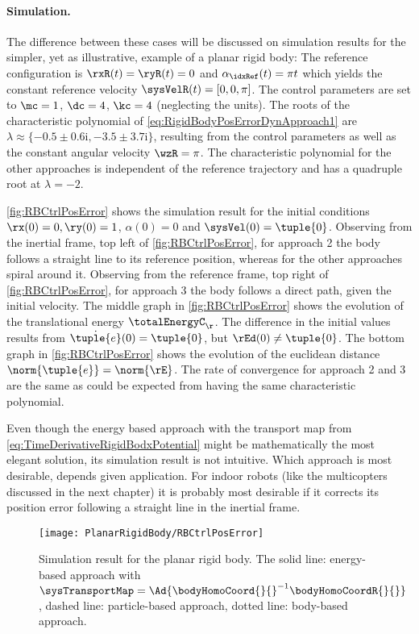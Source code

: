 \paragraph{Simulation.}
The difference between these cases will be discussed on simulation results for the simpler, yet as illustrative, example of a planar rigid body:
The reference configuration is $\rxR(t) = \ryR(t) = 0$ and $\alpha_{\idxRef}(t) = \pi t$ which yields the constant reference velocity $\sysVelR(t) = [0,0,\pi]$.
The control parameters are set to $\mc=1$, $\dc=4$, $\kc=4$ (neglecting the units).
The roots of the characteristic polynomial of \eqref{eq:RigidBodyPosErrorDynApproach1} are $\lambda \approx \{-0.5 \pm 0.6\mathrm{i}, -3.5 \pm 3.7\mathrm{i} \}$, resulting from the control parameters as well as the constant angular velocity $\wzR=\pi$.
The characteristic polynomial for the other approaches is independent of the reference trajectory and has a quadruple root at $\lambda = -2$.

\autoref{fig:RBCtrlPosError} shows the simulation result for the initial conditions $\rx(0) = 0, \ry(0) = 1$, $\alpha(0) = 0$ and $\sysVel(0) = \tuple{0}$.
Observing from the inertial frame, top left of \autoref{fig:RBCtrlPosError}, for approach 2 the body follows a straight line to its reference position, whereas for the other approaches spiral around it.
Observing from the reference frame, top right of \autoref{fig:RBCtrlPosError}, for approach 3 the body follows a direct path, given the initial velocity.
The middle graph in \autoref{fig:RBCtrlPosError} shows the evolution of the translational energy $\totalEnergyC_{\r}$.
The difference in the initial values results from $\dot{\tuple{e}}(0) = \tuple{0}$, but $\rEd(0) \neq \tuple{0}$.
The bottom graph in \autoref{fig:RBCtrlPosError} shows the evolution of the euclidean distance $\norm{\tuple{e}} = \norm{\rE}$.
The rate of convergence for approach 2 and 3 are the same as could be expected from having the same characteristic polynomial.

Even though the energy based approach with the transport map from \eqref{eq:TimeDerivativeRigidBodxPotential} might be mathematically the most elegant solution, its simulation result is not intuitive.
Which approach is most desirable, depends given application.
For indoor robots (like the multicopters discussed in the next chapter) it is probably most desirable if it corrects its position error following a straight line in the inertial frame.

\begin{figure}[ht]
 \centering
 \texttt{[image: PlanarRigidBody/RBCtrlPosError]}
 \caption{Simulation result for the planar rigid body. The solid line: energy-based approach with $\sysTransportMap = \Ad{\bodyHomoCoord{}{}^{-1}\bodyHomoCoordR{}{}}$, dashed line: particle-based approach, dotted line: body-based approach.}
 \label{fig:RBCtrlPosError}
\end{figure}


